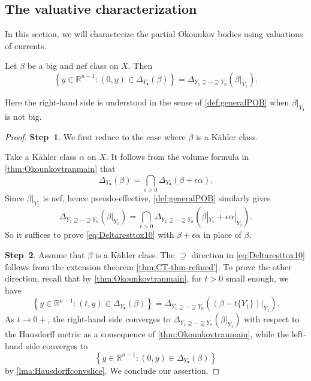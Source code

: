 \subsection{The valuative characterization}
\label{subsec:tpob_valuative}
In this section, we will characterize the partial Okounkov bodies using valuations of currents.

\begin{lemma}\label{lma:Kahlerclassokounrest}
    Let $\beta$ be a big and nef class on $X$. Then
    \begin{equation}\label{eq:Deltaresttox10}
    \left\{ y\in \mathbb{R}^{n-1}: (0,y)\in \Delta_{Y_{\bullet}}(\beta)\right\}=\Delta_{Y_1\supseteq \cdots \supseteq Y_n}(\beta|_{Y_1}).
    \end{equation}
\end{lemma}
Here the right-hand side is understood in the sense of \cref{def:generalPOB} when $\beta|_{Y_1}$ is not big.
\begin{proof}
    \textbf{Step~1}. We first reduce to the case where $\beta$ is a Kähler class.

    Take a Kähler class $\alpha$ on $X$. It follows from the volume formula in \cref{thm:Okounkovtranmain} that
    \[
        \Delta_{Y_{\bullet}}(\beta)=\bigcap_{\epsilon>0}\Delta_{Y_{\bullet}}(\beta+\epsilon\alpha).
    \]
    Since $\beta|_{Y_1}$ is nef, hence pseudo-effective, \cref{def:generalPOB} similarly gives
    \[
        \Delta_{Y_1\supseteq \cdots \supseteq Y_n}(\beta|_{Y_1})= \bigcap_{\epsilon>0}\Delta_{Y_1\supseteq \cdots \supseteq Y_n}(\beta|_{Y_1}+\epsilon \alpha|_{Y_1}).
    \]
    So it suffices to prove \eqref{eq:Deltaresttox10} with $\beta+\epsilon\alpha$ in place of $\beta$.

    \textbf{Step~2}. Assume that $\beta$ is a Kähler class.
    The $\supseteq$ direction in \eqref{eq:Deltaresttox10} follows from the extension theorem \cref{thm:CT-thm-refined'}. To prove the other direction, recall that by \cref{thm:Okounkovtranmain}, for $t>0$ small enough, we have
    \[
    \left\{ y\in \mathbb{R}^{n-1}: (t,y)\in \Delta_{Y_{\bullet}}(\beta) \right\}=\Delta_{Y_1\supseteq \cdots \supseteq Y_n}\left((\beta-t\{Y_1\})|_{Y_1}\right).
    \]
    As $t\to 0+$, the right-hand side converges to $\Delta_{Y_1\supseteq \cdots \supseteq Y_n}(\beta|_{Y_1})$ with respect to the Hausdorff metric as a consequence of \cref{thm:Okounkovtranmain}, while the left-hand side converges to
    \[
    \left\{ y\in \mathbb{R}^{n-1}: (0,y)\in \Delta_{Y_{\bullet}}(\beta) \right\}
    \]
    by \cref{lma:Hausdorffconvslice}. We conclude our assertion.
\end{proof}

